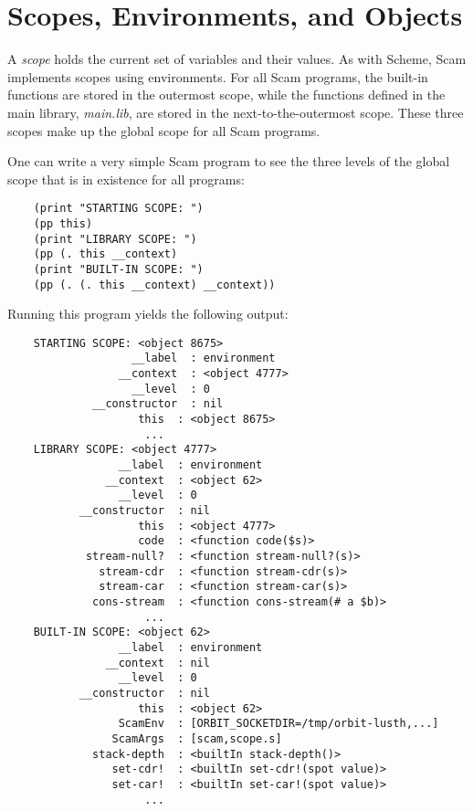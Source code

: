 \chapter{Scopes, Environments, and Objects}
\label{ScopesEnvironmentsObjects}

A {\it scope} holds the current set of variables and their values.
As with Scheme, Scam implements scopes using environments.
For all Scam programs, the built-in functions are stored
in the outermost scope, while the functions defined
in the main library, {\it main.lib}, are stored in the next-to-the-outermost
scope. These three scopes make up the global scope for all 
Scam programs.

One can write a very simple Scam program to see the three
levels of the global scope that is in existence for all programs:

\begin{verbatim}
    (print "STARTING SCOPE: ")
    (pp this)
    (print "LIBRARY SCOPE: ")
    (pp (. this __context)
    (print "BUILT-IN SCOPE: ")
    (pp (. (. this __context) __context))
\end{verbatim}

Running this program yields the following output:

\begin{verbatim}
    STARTING SCOPE: <object 8675>
                   __label  : environment
                 __context  : <object 4777>
                   __level  : 0
             __constructor  : nil
                    this  : <object 8675>
                     ...
    LIBRARY SCOPE: <object 4777>
                 __label  : environment
               __context  : <object 62>
                 __level  : 0
           __constructor  : nil
                    this  : <object 4777>
                    code  : <function code($s)>
            stream-null?  : <function stream-null?(s)>
              stream-cdr  : <function stream-cdr(s)>
              stream-car  : <function stream-car(s)>
             cons-stream  : <function cons-stream(# a $b)>
                     ...
    BUILT-IN SCOPE: <object 62>
                 __label  : environment
               __context  : nil
                 __level  : 0
           __constructor  : nil
                    this  : <object 62>
                 ScamEnv  : [ORBIT_SOCKETDIR=/tmp/orbit-lusth,...]
                ScamArgs  : [scam,scope.s]
             stack-depth  : <builtIn stack-depth()>
                set-cdr!  : <builtIn set-cdr!(spot value)>
                set-car!  : <builtIn set-car!(spot value)>
                     ...
\end{verbatim}

